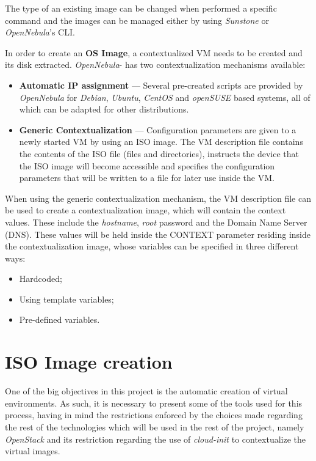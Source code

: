 The type of an existing image can be changed when performed a specific command and the images can be managed either by using \textit{Sunstone} or \textit{OpenNebula}'s CLI.

In order to create an \textbf{OS Image}, a contextualized VM needs to be created and its disk extracted.
\textit{OpenNebula}- has two contextualization mechanisms available:

\begin{itemize}
\item \textbf{Automatic IP assignment} --- Several pre-created scripts are provided by \textit{OpenNebula} for \textit{Debian}, \textit{Ubuntu}, \textit{CentOS} and \textit{openSUSE} based systems, all of which can be adapted for other distributions.
\item \textbf{Generic Contextualization} --- Configuration parameters are given to a newly started VM by using an ISO image. The VM description file contains the contents of the ISO file (files and directories), instructs the device that the ISO image will become accessible and specifies the configuration parameters that will be written to a file for later use inside the VM.
\end{itemize}

When using the generic contextualization mechanism, the VM description file can be used to create a contextualization image, which will contain the context values. These include the \textit{hostname}, \textit{root} password and the Domain Name Server (DNS). These values will be held inside the CONTEXT parameter residing inside the contextualization image, whose variables can be specified in three different ways:

\begin{itemize}
\item Hardcoded;
\item Using template variables;
\item Pre-defined variables.~\cite{nebula-contextualization}
\end{itemize}

\clearpage
\section{ISO Image creation} \label{sec:iso}

One of the big objectives in this project is the automatic creation of virtual environments. As such, it is necessary to present some of the tools used for this process, having in mind the restrictions enforced by the choices made regarding the rest of the technologies which will be used in the rest of the project, namely \textit{OpenStack} and its restriction regarding the use of \textit{cloud-init} to contextualize the virtual images.

